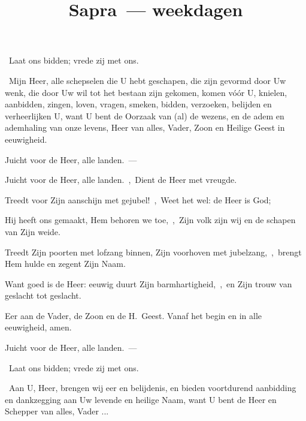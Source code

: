 \documentclass[12pt,twoside,a5paper]{article}
\begin{document}
\title{Sapra~--- weekdagen}
\author{}
\date{}
\maketitle


\begin{halfparskip}
  \dd~Laat ons bidden; vrede zij met ons.

  \cc~Mijn Heer, alle schepselen die U hebt geschapen, die zijn gevormd door Uw wenk, die door Uw wil tot het bestaan zijn gekomen, komen vóór U, knielen, aanbidden, zingen, loven, vragen, smeken, bidden, verzoeken, belijden en verheerlijken U, want U bent de Oorzaak van (al) de wezens, en de adem en ademhaling van onze levens, Heer van alles, Vader, Zoon en Heilige Geest in eeuwigheid.
\end{halfparskip}


\begin{halfparskip}
   Juicht voor de Heer, alle landen.~--- 

  Juicht voor de Heer, alle landen.~\sep\ Dient de Heer met vreugde.

  Treedt voor Zijn aanschijn met gejubel!~\sep\ Weet het wel: de Heer is God;

  Hij heeft ons gemaakt, Hem behoren we toe,~\sep\ Zijn volk zijn wij en de schapen van Zijn weide.

  Treedt Zijn poorten met lofzang binnen, Zijn voorhoven met jubelzang,~\sep\ brengt Hem hulde en zegent Zijn Naam.

  Want goed is de Heer: eeuwig duurt Zijn barmhartigheid,~\sep\ en Zijn trouw van geslacht tot geslacht.

  Eer aan de Vader, de Zoon en de H.~Geest. Vanaf het begin en in alle eeuwigheid, amen.

   Juicht voor de Heer, alle landen.~--- 
\end{halfparskip}

\begin{halfparskip}
  \dd~Laat ons bidden; vrede zij met ons.

  \cc~Aan U, Heer, brengen wij eer en belijdenis, en bieden voortdurend aanbidding en dankzegging aan Uw levende en heilige Naam, want U bent de Heer en Schepper van alles, Vader ...
\end{halfparskip}
\end{document}
